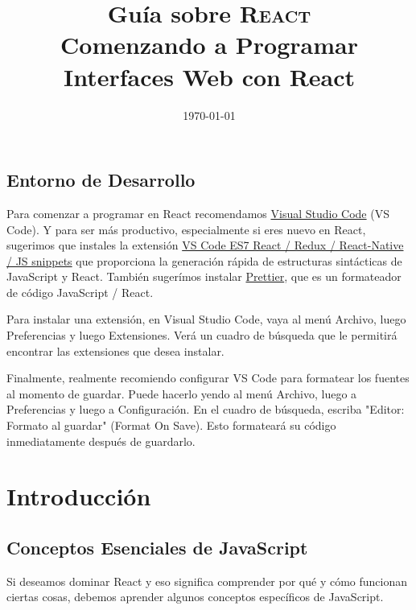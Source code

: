 \documentclass[a4paper, oneside, titlepage, 12pt]{book}
\title{%
	Guía sobre \textsc{React}\\
	\large Comenzando a Programar Interfaces Web con React}
\date{\today}
\begin{document}
\maketitle
\tableofcontents

\chapter*{Entorno de Desarrollo}

Para comenzar a programar en React recomendamos \href{https://code.visualstudio.com/} {Visual Studio Code} (VS Code). Y para ser más productivo, especialmente si eres nuevo en React, sugerimos que instales la extensión \href {https://marketplace.visualstudio.com/items?itemName=dsznajder.es7-react-js-snippets} {VS Code ES7 React / Redux / React-Native / JS snippets} que proporciona la generación rápida de estructuras sintácticas de JavaScript y React. También sugerímos instalar \href {https://marketplace.visualstudio.com/items?itemName=esbenp.prettier-vscode} {Prettier}, que es un formateador de código JavaScript / React.
\newline

Para instalar una extensión, en Visual Studio Code, vaya al menú Archivo, luego Preferencias y luego Extensiones. Verá un cuadro de búsqueda que le permitirá encontrar las extensiones que desea instalar.
\newline

Finalmente, realmente recomiendo configurar VS Code para formatear los fuentes al momento de guardar. Puede hacerlo yendo al menú Archivo, luego a Preferencias y luego a Configuración. En el cuadro de búsqueda, escriba "Editor: Formato al guardar" (Format On Save). Esto formateará su código inmediatamente después de guardarlo.

\part{Introducción}
		
\chapter{Conceptos Esenciales de JavaScript}

Si deseamos dominar React y eso significa comprender por qué y cómo funcionan ciertas cosas, debemos aprender algunos conceptos específicos de JavaScript.
\newline
\end{document}

